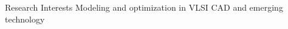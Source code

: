 
\begin{rSection}{Research Interests}
    Modeling and optimization in VLSI CAD and emerging technology
\end{rSection}

